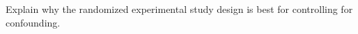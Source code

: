 
Explain why the randomized experimental study design is best for controlling for confounding.

\TextEntry
